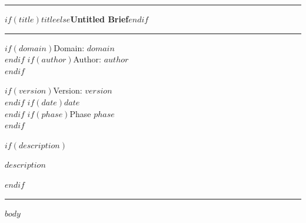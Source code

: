 \documentclass[12pt, letterpaper]{article}
\begin{document}

\vspace*{0.2in}
{\color{policy-navy}\rule{\linewidth}{2pt}}
\vspace{8pt}

{\fontsize{22}{26}\selectfont\bfseries\color{policy-navy}
$if(title)$$title$$else$Untitled Brief$endif$}

\vspace{10pt}
{\color{policy-rule}\rule{\linewidth}{0.5pt}}
\vspace{6pt}

\begin{minipage}[t]{0.6\linewidth}
$if(domain)${\small\textsf{\color{policy-meta}Domain: \textbf{$domain$}}}\\[2pt]$endif$
$if(author)${\small\textsf{\color{policy-meta}Author: $author$}}\\[2pt]$endif$
\end{minipage}
\begin{minipage}[t]{0.38\linewidth}
\raggedleft
$if(version)${\small\textsf{\color{policy-meta}Version: $version$}}\\[2pt]$endif$
$if(date)${\small\textsf{\color{policy-meta}$date$}}\\[2pt]$endif$
$if(phase)${\small\textsf{\color{policy-meta}Phase $phase$}}\\[2pt]$endif$
\end{minipage}

$if(description)$
\vspace{14pt}
\noindent\colorbox{policy-navy!6}{%
  \begin{minipage}{\dimexpr\linewidth-2\fboxsep}
    \vspace{8pt}
    \small $description$
    \vspace{8pt}
  \end{minipage}%
}
$endif$

\vspace{16pt}
{\color{policy-rule}\rule{\linewidth}{0.5pt}}
\vspace{14pt}

$body$
\end{document}

